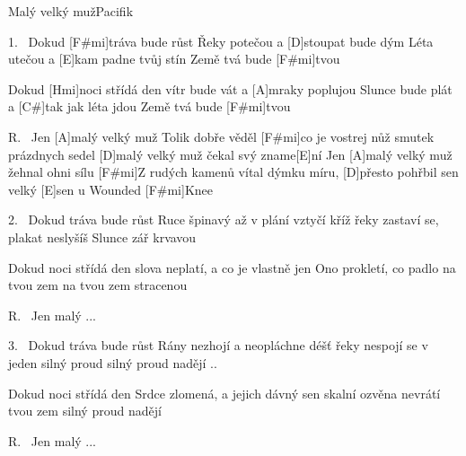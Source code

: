 \begin{song}{Malý velký muž}{Pacifik}


\begin{xverse}{1.~}
Dokud [F#mi]tráva bude růst
Řeky potečou a [D]stoupat bude dým
Léta utečou a [E]kam padne tvůj stín
Země tvá bude [F#mi]tvou

Dokud [Hmi]noci střídá den
vítr bude vát a [A]mraky poplujou
Slunce bude plát a [C#]tak jak léta jdou
Země tvá bude [F#mi]tvou
\end{xverse}


\begin{xverse}{R.~}
Jen [A]malý velký muž
Tolik dobře věděl [F#mi]co je vostrej nůž
smutek prázdnych sedel
[D]malý velký muž čekal svý zname[E]ní
Jen [A]malý velký muž
žehnal ohni sílu [F#mi]Z rudých kamenů
vítal dýmku míru, [D]přesto pohřbil sen
velký [E]sen u Wounded [F#mi]Knee
\end{xverse}


\begin{xverse}{2.~}
Dokud tráva bude růst
Ruce špinavý až v plání vztyčí kříž
řeky zastaví se, plakat neslyšíš
Slunce zář krvavou

Dokud noci střídá den
slova neplatí, a co je vlastně jen
Ono prokletí, co padlo na tvou zem
na tvou zem stracenou
\end{xverse}


\begin{xverse}{R.~}
Jen malý ...
\end{xverse}

\begin{xverse}{3.~}
Dokud tráva bude růst
Rány nezhojí a neopláchne déšť
řeky nespojí se v jeden silný proud
silný proud nadějí ..

Dokud noci střídá den
Srdce zlomená, a jejich dávný sen
skalní ozvěna nevrátí tvou zem
silný proud nadějí
\end{xverse}

\begin{xverse}{R.~}
Jen malý ...
\end{xverse}
\end{song}

